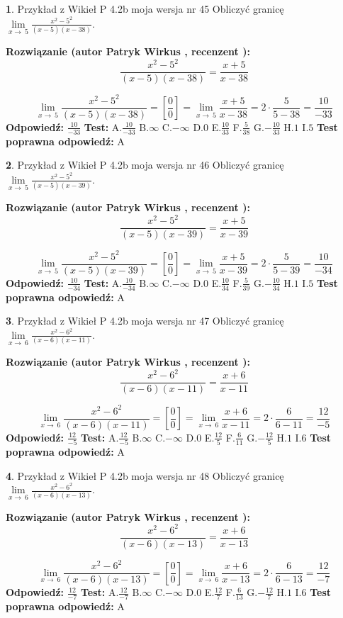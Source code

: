 \documentclass[12pt, a4paper]{article}
\theoremstyle{definition} %
\newtheorem{zad}{}
\newcommand{\zadStart}[1]{\begin{zad}#1\newline}
\newcommand{\zadStop}{\end{zad}}
\newcommand{\rozwStart}[2]{\noindent \textbf{Rozwiązanie (autor #1 , recenzent #2): }\newline}
\newcommand{\rozwStop}{\newline}
\newcommand{\odpStart}{\noindent \textbf{Odpowiedź:}\newline}
\newcommand{\odpStop}{\newline}
\newcommand{\testStart}{\noindent \textbf{Test:}\newline}
\newcommand{\testStop}{\newline}
\newcommand{\kluczStart}{\noindent \textbf{Test poprawna odpowiedź:}\newline}
\newcommand{\kluczStop}{\newline}
\begin{document}
\zadStart{Przykład z Wikieł P 4.2b moja wersja nr 45}
Obliczyć granicę $\lim\limits_{x\to\ 5}\frac{x^{2}-5^{2}}{(x-5)(x-38)}$.
\zadStop
\rozwStart{Patryk Wirkus}{}
$$\frac{x^{2}-5^{2}}{(x-5)(x-38)}=\frac{x+5}{x-38}$$

$$\lim\limits_{x\to\ 5}\frac{x^{2}-5^{2}}{(x-5)(x-38)}=[\frac{0}{0}]=\lim\limits_{x\to\ 5}\frac{x+5}{x-38}=2 \cdot \frac{5}{5-38} = \frac{10}{-33}$$
\rozwStop
\odpStart
$\frac{10}{-33}$
\odpStop
\testStart
A.$\frac{10}{-33}$
B.$\infty$
C.$-\infty$
D.$0$
E.$\frac{10}{33}$
F.$\frac{5}{38}$
G.$-\frac{10}{33}$
H.$1$
I.$5$
\testStop
\kluczStart
A
\kluczStop



\zadStart{Przykład z Wikieł P 4.2b moja wersja nr 46}
Obliczyć granicę $\lim\limits_{x\to\ 5}\frac{x^{2}-5^{2}}{(x-5)(x-39)}$.
\zadStop
\rozwStart{Patryk Wirkus}{}
$$\frac{x^{2}-5^{2}}{(x-5)(x-39)}=\frac{x+5}{x-39}$$

$$\lim\limits_{x\to\ 5}\frac{x^{2}-5^{2}}{(x-5)(x-39)}=[\frac{0}{0}]=\lim\limits_{x\to\ 5}\frac{x+5}{x-39}=2 \cdot \frac{5}{5-39} = \frac{10}{-34}$$
\rozwStop
\odpStart
$\frac{10}{-34}$
\odpStop
\testStart
A.$\frac{10}{-34}$
B.$\infty$
C.$-\infty$
D.$0$
E.$\frac{10}{34}$
F.$\frac{5}{39}$
G.$-\frac{10}{34}$
H.$1$
I.$5$
\testStop
\kluczStart
A
\kluczStop



\zadStart{Przykład z Wikieł P 4.2b moja wersja nr 47}
Obliczyć granicę $\lim\limits_{x\to\ 6}\frac{x^{2}-6^{2}}{(x-6)(x-11)}$.
\zadStop
\rozwStart{Patryk Wirkus}{}
$$\frac{x^{2}-6^{2}}{(x-6)(x-11)}=\frac{x+6}{x-11}$$

$$\lim\limits_{x\to\ 6}\frac{x^{2}-6^{2}}{(x-6)(x-11)}=[\frac{0}{0}]=\lim\limits_{x\to\ 6}\frac{x+6}{x-11}=2 \cdot \frac{6}{6-11} = \frac{12}{-5}$$
\rozwStop
\odpStart
$\frac{12}{-5}$
\odpStop
\testStart
A.$\frac{12}{-5}$
B.$\infty$
C.$-\infty$
D.$0$
E.$\frac{12}{5}$
F.$\frac{6}{11}$
G.$-\frac{12}{5}$
H.$1$
I.$6$
\testStop
\kluczStart
A
\kluczStop



\zadStart{Przykład z Wikieł P 4.2b moja wersja nr 48}
Obliczyć granicę $\lim\limits_{x\to\ 6}\frac{x^{2}-6^{2}}{(x-6)(x-13)}$.
\zadStop
\rozwStart{Patryk Wirkus}{}
$$\frac{x^{2}-6^{2}}{(x-6)(x-13)}=\frac{x+6}{x-13}$$

$$\lim\limits_{x\to\ 6}\frac{x^{2}-6^{2}}{(x-6)(x-13)}=[\frac{0}{0}]=\lim\limits_{x\to\ 6}\frac{x+6}{x-13}=2 \cdot \frac{6}{6-13} = \frac{12}{-7}$$
\rozwStop
\odpStart
$\frac{12}{-7}$
\odpStop
\testStart
A.$\frac{12}{-7}$
B.$\infty$
C.$-\infty$
D.$0$
E.$\frac{12}{7}$
F.$\frac{6}{13}$
G.$-\frac{12}{7}$
H.$1$
I.$6$
\testStop
\kluczStart
A
\kluczStop
\end{document}
